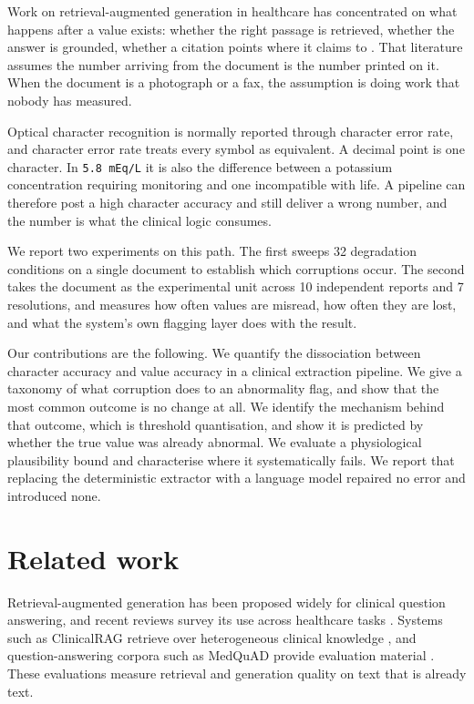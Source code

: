 \documentclass[11pt]{article}
\begin{document}
Work on retrieval-augmented generation in healthcare has concentrated on what happens after a
value exists: whether the right passage is retrieved, whether the answer is grounded, whether a
citation points where it claims to \citep{gao2023rag,amugongo2025rag,lu2024clinicalrag}. That
literature assumes the number arriving from the document is the number printed on it. When the
document is a photograph or a fax, the assumption is doing work that nobody has measured.

Optical character recognition is normally reported through character error rate, and character
error rate treats every symbol as equivalent. A decimal point is one character. In
\texttt{5.8 mEq/L} it is also the difference between a potassium concentration requiring
monitoring and one incompatible with life. A pipeline can therefore post a high character
accuracy and still deliver a wrong number, and the number is what the clinical logic consumes.

We report two experiments on this path. The first sweeps 32 degradation conditions on a single
document to establish which corruptions occur. The second takes the document as the
experimental unit across 10 independent reports and 7 resolutions, and measures how often
values are misread, how often they are lost, and what the system's own flagging layer does with
the result.

Our contributions are the following. We quantify the dissociation between character accuracy
and value accuracy in a clinical extraction pipeline. We give a taxonomy of what corruption
does to an abnormality flag, and show that the most common outcome is no change at all. We
identify the mechanism behind that outcome, which is threshold quantisation, and show it is
predicted by whether the true value was already abnormal. We evaluate a physiological
plausibility bound and characterise where it systematically fails. We report that replacing the
deterministic extractor with a language model repaired no error and introduced none.

\section{Related work}

Retrieval-augmented generation has been proposed widely for clinical question answering, and
recent reviews survey its use across healthcare tasks \citep{gao2023rag,amugongo2025rag}.
Systems such as ClinicalRAG retrieve over heterogeneous clinical knowledge
\citep{lu2024clinicalrag}, and question-answering corpora such as MedQuAD provide evaluation
material \citep{benabacha2019medquad}. These evaluations measure retrieval and generation
quality on text that is already text.
\end{document}
